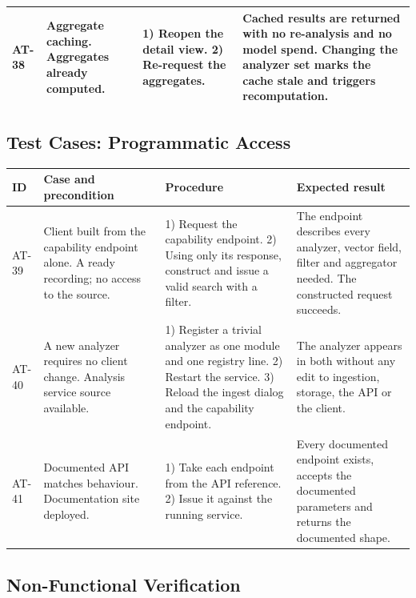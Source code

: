 \begin{table}[htbp]
\begin{tabularx}{\textwidth}{@{}L{0.9cm}L{3.2cm}XX@{}}
AT-38 & Aggregate caching. Aggregates already computed. &
1) Reopen the detail view. 2) Re-request the aggregates. &
Cached results are returned with no re-analysis and no model spend. Changing the
analyzer set marks the cache stale and triggers recomputation. \\

\bottomrule
\end{tabularx}
\end{table}

\subsection{Test Cases: Programmatic Access}

\begin{table}[htbp]
\centering
\footnotesize
\begin{tabularx}{\textwidth}{@{}L{0.9cm}L{3.2cm}XX@{}}
\toprule
\textbf{ID} & \textbf{Case and precondition} & \textbf{Procedure} & \textbf{Expected result} \\
\midrule

AT-39 & Client built from the capability endpoint alone. A ready recording; no access to
the source. &
1) Request the capability endpoint. 2) Using only its response, construct and issue a
valid search with a filter. &
The endpoint describes every analyzer, vector field, filter and aggregator needed. The
constructed request succeeds. \\

AT-40 & A new analyzer requires no client change. Analysis service source available. &
1) Register a trivial analyzer as one module and one registry line. 2) Restart the
service. 3) Reload the ingest dialog and the capability endpoint. &
The analyzer appears in both without any edit to ingestion, storage, the API or the
client. \\

AT-41 & Documented API matches behaviour. Documentation site deployed. &
1) Take each endpoint from the API reference. 2) Issue it against the running service. &
Every documented endpoint exists, accepts the documented parameters and returns the
documented shape. \\

\bottomrule
\end{tabularx}
\end{table}

\subsection{Non-Functional Verification}

